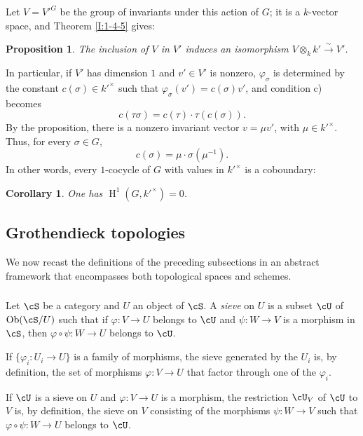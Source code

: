 \documentclass[12pt,oneside,english]{smfbook}
\DeclareMathOperator{\h}{H}
\DeclareMathOperator{\ob}{Ob}
\newcommand{\iso}{\xrightarrow\sim}
\newtheorem{proposition}[subsubsection]{Proposition}
\newtheorem{corollary}[subsubsection]{Corollary}
\begin{document}
Let $V={V'}^G$ be the group of invariants under this action of $G$; it is a $k$-vector space, and Theorem \ref{I:1-4-5} gives:

\begin{proposition}\label{I:1-5-2}
The inclusion of $V$ in $V'$ induces an isomorphism $V\otimes_k k' \iso V'$.
\end{proposition}

In particular, if $V'$ has dimension $1$ and $v'\in V'$ is nonzero, $\varphi_\sigma$ is determined by the constant $c(\sigma)\in{k'}^\times$ such that $\varphi_\sigma(v')=c(\sigma)v'$, and condition c) becomes
\[
  c(\tau\sigma) = c(\tau)\cdot \tau(c(\sigma))\text{.}
\]
By the proposition, there is a nonzero invariant vector $v=\mu v'$, with $\mu\in{k'}^\times$. Thus, for every $\sigma\in G$,
\[
  c(\sigma) = \mu\cdot \sigma(\mu^{-1})\text{.}
\]
In other words, every $1$-cocycle of $G$ with values in ${k'}^\times$ is a coboundary:

\begin{corollary}\label{I:1-5-3}
One has $\h^1(G,{k'}^\times)=0$.
\end{corollary}

\subsection{Grothendieck topologies}\label{I:1-6}

We now recast the definitions of the preceding subsections in an abstract framework that encompasses both topological spaces and schemes.

\subsubsection{}\label{I:1-6-1}

Let $\cS$ be a category and $U$ an object of $\cS$. A \emph{sieve} on $U$ is a subset $\cU$ of $\ob(\cS/U)$ such that if $\varphi:V\to U$ belongs to $\cU$ and $\psi:W\to V$ is a morphism in $\cS$, then $\varphi\circ\psi:W\to U$ belongs to $\cU$.

If $\{\varphi_i:U_i\to U\}$ is a family of morphisms, the sieve generated by the $U_i$ is, by definition, the set of morphisms $\varphi:V\to U$ that factor through one of the $\varphi_i$.

If $\cU$ is a sieve on $U$ and $\varphi:V\to U$ is a morphism, the restriction $\cU_V$ of $\cU$ to $V$ is, by definition, the sieve on $V$ consisting of the morphisms $\psi:W\to V$ such that $\varphi\circ\psi:W\to U$ belongs to $\cU$.
\end{document}
